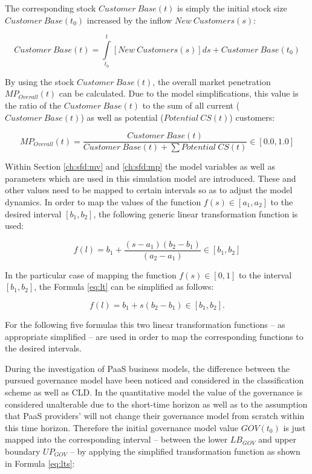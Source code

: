 The corresponding stock $Customer~Base(t)$ is simply the initial stock size $\mathit{Customer~Base(t_0)}$ increased by the inflow $New~Customers(s)$:

\begin{equation}\label{eq:cb}
	\mathit{Customer~Base(t)} = \int\limits_{t_0}^t \mathit{[New~Customers(s)]ds} + \mathit{Customer~Base(t_0)}
\end{equation}

By using the stock $Customer~Base(t)$, the overall market penetration $MP_{Overall}(t)$ can be calculated. Due to the model simplifications, this value is the ratio of the $Customer~Base(t)$ to the sum of all current \linebreak ($Customer~Base(t)$) as well as potential ($Potential~CS(t)$) customers:

\begin{equation}\label{eq:mpo}
	MP_{Overall}(t) = \frac{\mathit{Customer~Base(t)}}{\mathit{Customer~Base(t)} + \sum \mathit{Potential~CS(t)}} \in [0.0,1.0]
\end{equation}

Within Section \ref{ch:sfd:mv} and \ref{ch:sfd:mp} the model variables as well as parameters which are used in this simulation model are introduced. These and other values need to be mapped to certain intervals so as to adjust the model dynamics. In order to map the values of the function $f(s) \in [a_1,a_2]$ to the desired interval $[b_1,b_2]$, the following generic linear transformation function is used:

\begin{equation}\label{eq:lt}
	f(l) = b_{1} + \frac{(s-a_1)(b_2-b_1)}{(a_2-a_1)} \in [b_1,b_2]
\end{equation}

In the particular case of mapping the function $f(s) \in [0,1]$ to the interval $[b_1,b_2]$, the Formula \ref{eq:lt} can be simplified as follows:

\begin{equation}\label{eq:lts}
	f(l) = b_{1} + s (b_{2}-b_{1}) \in [b_{1},b_{2}].
\end{equation}

For the following five formulas this two linear transformation functions -- as appropriate simplified -- are used in order to map the corresponding functions to the desired intervals.

During the investigation of \ac{PaaS} business models, the difference between the pursued governance model have been noticed and considered in the classification scheme as well as \ac{CLD}. In the quantitative model the value of the governance is considered unalterable due to the short-time horizon as well as to the assumption that \ac{PaaS} providers' will not change their governance model from scratch within this time horizon. Therefore the initial governance model value $GOV(t_0)$ is just mapped into the corresponding interval -- between the lower $LB_{GOV}$ and upper boundary $UP_{GOV}$ -- by applying the simplified transformation function as shown in Formula \ref{eq:lts}:

